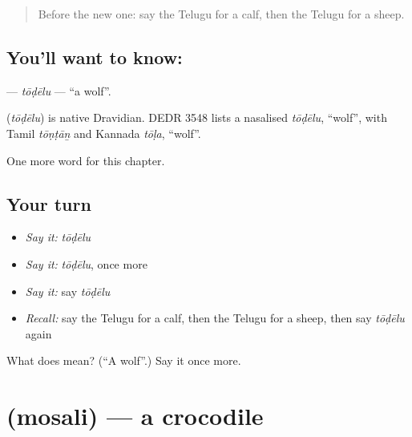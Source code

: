 \label{lesson:TE-C302-todelu}



\begin{quote}
Before the new one: say the Telugu for a calf, then the Telugu for a sheep.
\end{quote}

\subsection*{You'll want to know: }
\textbf{} — \emph{tōḍēlu} — \textquotedblleft{}a wolf\textquotedblright{}.

\begin{cousinweb}
\textbf{} (\emph{tōḍēlu}) is native Dravidian. DEDR 3548 lists a nasalised \emph{tōḍēlu}, \textquotedblleft{}wolf\textquotedblright{}, with Tamil \emph{tōṇṭāṉ} and Kannada \emph{tōḷa}, \textquotedblleft{}wolf\textquotedblright{}.
\end{cousinweb}

\begin{grammarlens}[title={What you've built}]
One more word for this chapter.
\end{grammarlens}

\subsection*{Your turn}
\begin{itemize}
\raggedright
  \item \emph{Say it:} \emph{tōḍēlu}
  \item \emph{Say it:} \emph{tōḍēlu}, once more
  \item \emph{Say it:} say \emph{tōḍēlu}
  \item \emph{Recall:} say the Telugu for a calf, then the Telugu for a sheep, then say \emph{tōḍēlu} again
\end{itemize}

\begin{tcolorbox}[breakable,colback=teal!4,colframe=teal!35!black,title={Before you move on}]
What does  mean? (\textquotedblleft{}A wolf\textquotedblright{}.) Say it once more.
\end{tcolorbox}
\section[\texorpdfstring{\te{మొసలి} (mosali)}{మొసలి (mosali)}]{ (mosali) — a crocodile}

